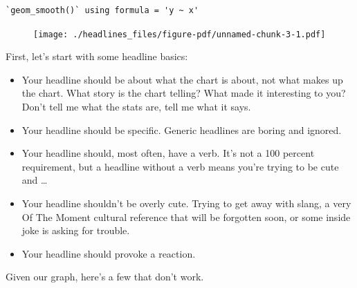 \documentclass[
  letterpaper,
  DIV=11,
  numbers=noendperiod]{scrreprt}
\providecommand{\tightlist}{%
  \setlength{\itemsep}{0pt}\setlength{\parskip}{0pt}}\usepackage{longtable,booktabs,array}
\begin{document}
\begin{verbatim}
`geom_smooth()` using formula = 'y ~ x'
\end{verbatim}

\begin{figure}[H]

{\centering \texttt{[image: ./headlines\_files/figure-pdf/unnamed-chunk-3-1.pdf]}

}

\end{figure}

First, let's start with some headline basics:

\begin{itemize}
\tightlist
\item
  Your headline should be about what the chart is about, not what makes
  up the chart. What story is the chart telling? What made it
  interesting to you? Don't tell me what the stats are, tell me what it
  says.
\item
  Your headline should be specific. Generic headlines are boring and
  ignored.
\item
  Your headline should, most often, have a verb. It's not a 100 percent
  requirement, but a headline without a verb means you're trying to be
  cute and \ldots{}
\item
  Your headline shouldn't be overly cute. Trying to get away with slang,
  a very Of The Moment cultural reference that will be forgotten soon,
  or some inside joke is asking for trouble.
\item
  Your headline should provoke a reaction.
\end{itemize}

Given our graph, here's a few that don't work.
\end{document}
